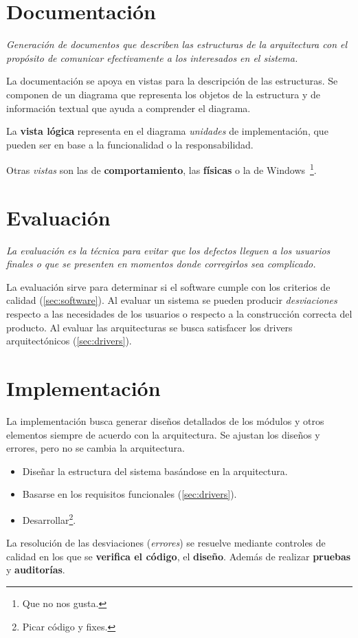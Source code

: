 \section{Documentación}
\label{sec:documentacion}

\begin{center}
  \textit{Generación de documentos que describen las estructuras de la
  arquitectura con el propósito de comunicar efectivamente a los
  interesados en el sistema.}
\end{center}

La documentación se apoya en vistas para la descripción de las
estructuras. Se componen de un diagrama que representa los objetos de
la estructura y de información textual que ayuda a comprender el
diagrama.

La \textbf{vista lógica} representa en el diagrama
\emph{unidades} de implementación, que pueden ser en base a la
funcionalidad o la responsabilidad.

Otras \emph{vistas} son las de \textbf{comportamiento}, las \textbf{físicas}
o la de Windows\texttrademark~\footnote{Que no nos gusta.}.

\section{Evaluación}
\label{sec:arquitectura:evaluacion}

\begin{center}
  \textit{La evaluación es la técnica para evitar que los defectos lleguen a
  los usuarios finales o que se presenten en momentos donde
  corregirlos sea complicado.}
\end{center}

La evaluación sirve para determinar si el software cumple con los
criterios de calidad (\ref{sec:software}). Al evaluar un sistema se
pueden producir \emph{desviaciones} respecto a las necesidades de los
usuarios o respecto a la construcción correcta del producto. Al
evaluar las arquitecturas se busca satisfacer los drivers
arquitectónicos (\ref{sec:drivers}).

\section{Implementación}
\label{sec:implementacion}

La implementación busca generar diseños detallados de los módulos y
otros elementos siempre de acuerdo con la arquitectura. Se ajustan los
diseños y errores, pero no se cambia la arquitectura.

\begin{itemize}[noitemsep]
\item Diseñar la estructura del sistema basándose en la arquitectura.
\item Basarse en los requisitos funcionales (\ref{sec:drivers}).
\item Desarrollar\footnote{Picar código y fixes.}.
\end{itemize}

La resolución de las desviaciones (\emph{errores}) se resuelve
mediante controles de calidad en los que se \textbf{verifica el
  código}, el \textbf{diseño}. Además de realizar \textbf{pruebas} y
\textbf{auditorías}.

